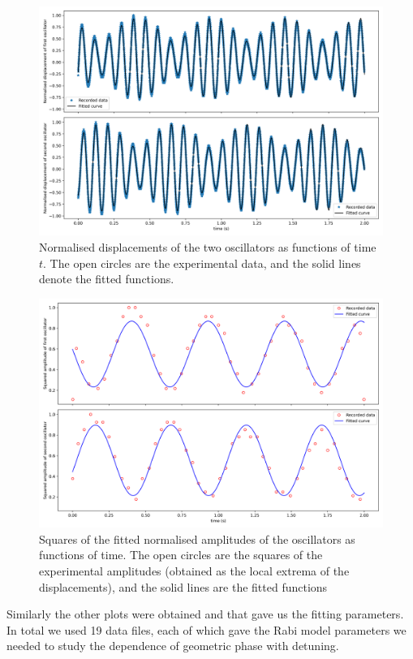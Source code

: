 \begin{figure}[H]
	\centering
	\includegraphics[scale=0.4]{01.png}
	\caption{Normalised displacements of the two oscillators as functions of time $ t $. The
		open circles are the experimental data, and the solid lines denote the fitted functions.}
	\label{fig:first}
\end{figure}

\begin{figure}[H]
	\centering
	\includegraphics[scale=0.4]{01_squared.png}
	\caption{Squares of the fitted normalised amplitudes of the oscillators as functions of
		time. The open circles are the squares of the experimental amplitudes (obtained as the
		local extrema of the displacements), and the solid lines are the fitted functions}
	\label{fig:first_sq}
\end{figure}

Similarly the other plots were obtained and that gave us the fitting parameters. In total we used 19 data files, each of which gave the Rabi model parameters we needed to study the dependence of geometric phase with detuning. 

